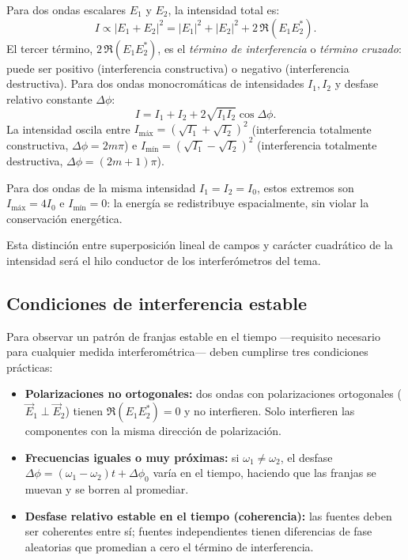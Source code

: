 \documentclass[12pt, a4paper]{article}
\theoremstyle{plain}
\theoremstyle{definition}
\theoremstyle{remark}
\newcommand{\ve}[1]{\vec{#1}}
\begin{document}
Para dos ondas escalares $E_1$ y $E_2$, la intensidad total es:
\begin{equation}
  I \propto \left|E_1+E_2\right|^2
  =|E_1|^2+|E_2|^2+2\,\Re\!\left(E_1E_2^*\right).
  \label{eq:def_interferencia_t6}
\end{equation}
El tercer término, $2\,\Re(E_1 E_2^*)$, es el \emph{término de interferencia}
o \emph{término cruzado}: puede ser positivo (interferencia constructiva) o
negativo (interferencia destructiva). Para dos ondas monocromáticas de
intensidades $I_1, I_2$ y desfase relativo constante $\Delta\phi$:
\begin{equation}
  I=I_1+I_2+2\sqrt{I_1I_2}\cos\Delta\phi.
  \label{eq:intensidad_2ondas_t6}
\end{equation}
La intensidad oscila entre $I_\text{máx} = (\sqrt{I_1}+\sqrt{I_2})^2$
(interferencia totalmente constructiva, $\Delta\phi = 2m\pi$) e
$I_\text{mín} = (\sqrt{I_1}-\sqrt{I_2})^2$ (interferencia totalmente
destructiva, $\Delta\phi = (2m+1)\pi$).

Para dos ondas de la misma intensidad $I_1=I_2=I_0$, estos extremos son
$I_\text{máx} = 4I_0$ e $I_\text{mín} = 0$: la energía se redistribuye
espacialmente, sin violar la conservación energética.

Esta distinción entre superposición lineal de campos y carácter cuadrático de
la intensidad será el hilo conductor de los interferómetros del tema.

\subsection{Condiciones de interferencia estable}

Para observar un patrón de franjas estable en el tiempo —requisito necesario
para cualquier medida interferométrica— deben cumplirse tres condiciones
prácticas:
\begin{itemize}
  \item \textbf{Polarizaciones no ortogonales:} dos ondas con polarizaciones
        ortogonales ($\ve{E}_1 \perp \ve{E}_2$) tienen $\Re(E_1 E_2^*) = 0$
        y no interfieren. Solo interfieren las componentes con la misma
        dirección de polarización.
  \item \textbf{Frecuencias iguales o muy próximas:} si $\omega_1 \neq \omega_2$,
        el desfase $\Delta\phi = (\omega_1-\omega_2)t + \Delta\phi_0$ varía en
        el tiempo, haciendo que las franjas se muevan y se borren al promediar.
  \item \textbf{Desfase relativo estable en el tiempo (coherencia):} las fuentes
        deben ser coherentes entre sí; fuentes independientes tienen diferencias
        de fase aleatorias que promedian a cero el término de interferencia.
\end{itemize}
\end{document}
